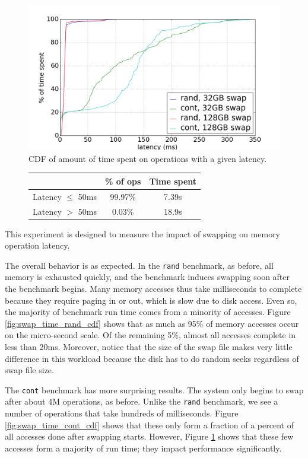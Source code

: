 \documentclass[twocolumn,11pt]{article}
\begin{document}
\begin{figure}[t]
    \includegraphics[width=\columnwidth]{figures/swap_time_cdf}
    \caption{CDF of amount of time spent on operations with a given
    latency.\label{fig:swap_time_cdf}}
\end{figure}

\begin{figure}[t]
    \centering
    \begin{tabular}{c||c|c}
        & \% of ops & Time spent \\ \hline \hline
        Latency $\le$ 50ms & 99.97\% & 7.39s \\
        Latency $>$ 50ms & 0.03\% & 18.9s \\
    \end{tabular}
\end{figure}

This experiment is designed to measure the impact of swapping on memory
operation latency.

The overall behavior is as expected. In the \texttt{rand} benchmark, as before, all
memory is exhausted quickly, and the benchmark induces swapping soon after the
benchmark begins. Many memory accesses thus take milliseconds to complete
because they require paging in or out, which is slow due to disk access.
Even so, the majority of benchmark run time comes from a minority of accesses.
Figure \ref{fig:swap_time_rand_cdf} shows that as much as 95\% of memory
accesses occur on the micro-second scale. Of the remaining 5\%, almost all
accesses complete in less than 20ms. Moreover, notice that the size of the
swap file makes very little difference in this workload because the disk has to
do random seeks regardless of swap file size.

The \texttt{cont} benchmark has more surprising results.
The system only begins to
swap after about 4M operations, as before. Unlike the \texttt{rand} benchmark, we see a
number of operations that take hundreds of milliseconds. Figure
\ref{fig:swap_time_cont_cdf} shows that these only form a fraction of a percent
of all accesses done after swapping starts. However, Figure
\ref{fig:swap_time_cdf} shows that these few accesses form a majority of run
time; they impact performance significantly.
\end{document}
